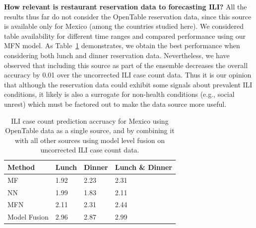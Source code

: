 

{\noindent \textbf{How relevant is restaurant reservation data to forecasting ILI?}} 
All the results thus far do not consider the OpenTable reservation data, since this source is available only for
Mexico (among the countries studied here). We considered table availability for different time ranges and compared
performance using our MFN model. As Table~\ref{tb:opentable} demonstrates, we obtain the best performance when
considering both lunch and dinner reservation data. Nevertheless, we have observed that including this source
as part of the ensemble decreases the overall accuracy by 0.01 over the uncorrected ILI case count data.
Thus it is our opinion that although the reservation data could exhibit some signals about prevalent ILI
conditions, it likely is also a surrogate for non-health conditions (e.g., social unrest) which must be factored
out to make the data source more useful.

\begin{table}[tb!]
  \scriptsize
\centering
\caption{\label{tb:opentable}  ILI case count prediction accruacy for Mexico using OpenTable data as a single source, and
by combining it with all other sources using model level fusion on uncorrected ILI case count data.}
\vspace{-1em}
\begin{tabular}{|p{1.5cm}|*{2}{l|}p{2cm}|}
\hline
Method& Lunch & Dinner & Lunch \& Dinner \\
\hline \hline
MF   & 1.92 & 2.23 & 2.31 \\
NN   & 1.99 & 1.83 & 2.11 \\
MFN  & 2.11 & 2.31 & 2.44 \\
Model Fusion & 2.96 & 2.87 & 2.99 \\
\hline
\end{tabular}
\end{table}

